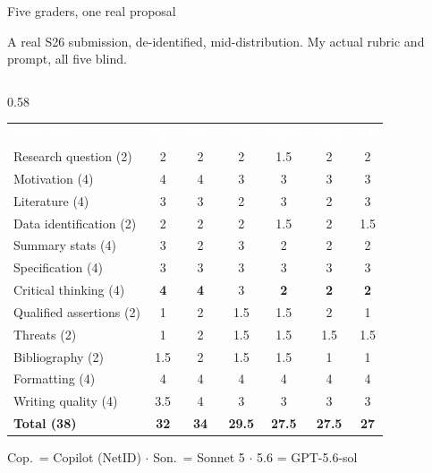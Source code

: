 \documentclass[aspectratio=169, 10pt]{beamer}
\begin{document}
\begin{frame}{Five graders, one real proposal}
\vskip-6pt
{\footnotesize A real S26 submission, de-identified, mid-distribution. My actual rubric and prompt, all five blind.\par}
\vskip1pt
\begin{columns}[T]
\begin{column}{0.58\textwidth}
{\scriptsize
\setlength{\tabcolsep}{2.2pt}\renewcommand{\arraystretch}{0.98}
\begin{tabular}{>{\raggedright\arraybackslash}m{2.45cm} c c c c c c}
\rowcolor{SlateTeal}
\textcolor{white}{\textbf{Criterion}} & \textcolor{white}{\textbf{Me}} & \textcolor{white}{\textbf{Cop.}} & \textcolor{white}{\textbf{Son.}} & \textcolor{white}{\textbf{Opus}} & \textcolor{white}{\textbf{Fable}} & \textcolor{white}{\textbf{5.6}} \\
\rowcolor{white}     Research question (2) & 2 & 2 & 2 & 1.5 & 2 & 2 \\
\rowcolor{PaleSage}  Motivation (4) & 4 & 4 & 3 & 3 & 3 & 3 \\
\rowcolor{white}     Literature (4) & 3 & 3 & 2 & 3 & 2 & 3 \\
\rowcolor{PaleSage}  Data identification (2) & 2 & 2 & 2 & 1.5 & 2 & 1.5 \\
\rowcolor{white}     Summary stats (4) & 3 & 2 & 3 & 2 & 2 & 2 \\
\rowcolor{PaleSage}  Specification (4) & 3 & 3 & 3 & 3 & 3 & 3 \\
\rowcolor{LightGold} Critical thinking (4) & \textbf{4} & \textbf{4} & 3 & \textbf{2} & \textbf{2} & \textbf{2} \\
\rowcolor{white}     Qualified assertions (2) & 1 & 2 & 1.5 & 1.5 & 2 & 1 \\
\rowcolor{PaleSage}  Threats (2) & 1 & 2 & 1.5 & 1.5 & 1.5 & 1.5 \\
\rowcolor{white}     Bibliography (2) & 1.5 & 2 & 1.5 & 1.5 & 1 & 1 \\
\rowcolor{PaleSage}  Formatting (4) & 4 & 4 & 4 & 4 & 4 & 4 \\
\rowcolor{white}     Writing quality (4) & 3.5 & 4 & 3 & 3 & 3 & 3 \\
\rowcolor{LightGold} \textbf{Total (38)} & \textbf{32} & \textbf{34} & \textbf{29.5} & \textbf{27.5} & \textbf{27.5} & \textbf{27} \\
\end{tabular}
}
\vskip2pt
{\scriptsize\color{CoolGray} Cop.\ = Copilot (NetID) $\cdot$ Son.\ = Sonnet 5 $\cdot$ 5.6 = GPT-5.6-sol\par}

\end{column}
\end{columns}
\end{frame}
\end{document}
